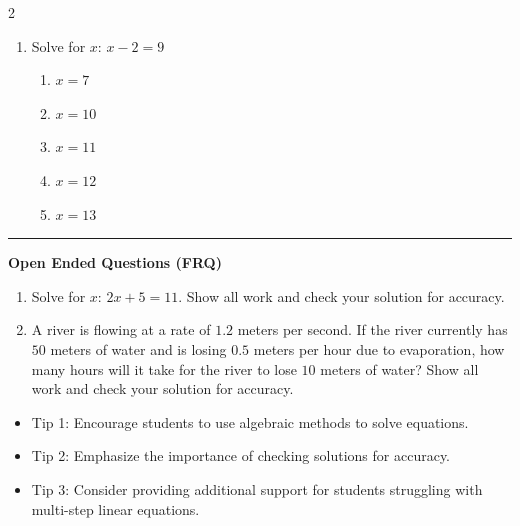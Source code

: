 \documentclass[10pt]{article}
\begin{document}
\begin{multicols}{2}
\begin{enumerate}[label=\textbf{Q\arabic*.}, leftmargin=*, itemsep=6pt, parsep=0pt]
  \item \small Solve for $x$: $x - 2 = 9$
  \begin{enumerate}[label=(\Alph*), leftmargin=0.6cm, nosep, itemsep=2pt]
    \item $x = 7$
    \item $x = 10$
    \item $x = 11$
    \item $x = 12$
    \item $x = 13$
  \end{enumerate}

\end{enumerate}
\end{multicols}

\vspace{-0.2cm}
\hrule
\vspace{0.2cm}
\textbf{\small Open Ended Questions (FRQ)}
\begin{enumerate}[label=\textbf{Q\arabic*.}, start=9, itemsep=5pt, topsep=0pt]

  \item \small Solve for $x$: $2x + 5 = 11$. Show all work and check your solution for accuracy. \vspace{2cm}

  \item \small A river is flowing at a rate of $1.2$ meters per second. If the river currently has $50$ meters of water and is losing $0.5$ meters per hour due to evaporation, how many hours will it take for the river to lose $10$ meters of water? Show all work and check your solution for accuracy. \vspace{2cm}

\end{enumerate}

\vfill

\begin{tcolorbox}[colback=blue!5, colframe=mainblue!50, title=\small \textbf{Chef's Tips}, fonttitle=\bfseries, bottom=1mm]
\begin{itemize}[noitemsep, topsep=2pt, leftmargin=0.5cm]
  \item \scriptsize Tip 1: Encourage students to use algebraic methods to solve equations.\item \scriptsize Tip 2: Emphasize the importance of checking solutions for accuracy.\item \scriptsize Tip 3: Consider providing additional support for students struggling with multi-step linear equations.
\end{itemize}
\end{tcolorbox}
\end{document}
